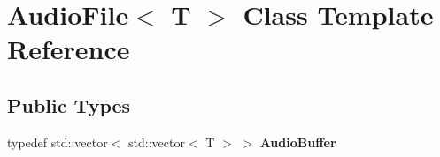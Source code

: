 \hypertarget{class_audio_file}{}\section{Audio\+File$<$ T $>$ Class Template Reference}
\label{class_audio_file}
\subsection*{Public Types}
\begin{DoxyCompactItemize}
\item 
\mbox{\label{class_audio_file_ad1260a47791dc30cbabfe3ff2ea099b1}} 
typedef std\+::vector$<$ std\+::vector$<$ T $>$ $>$ {\bfseries Audio\+Buffer}
\end{DoxyCompactItemize}
